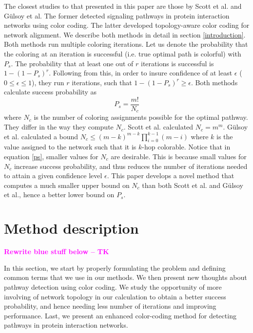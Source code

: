 \documentclass{ws-procs11x85}
\newcommand{\tk}[1]{{\bf {\textcolor{magenta}{#1 -- TK}}}}
\begin{document}
The closest studies to that presented in this paper are those by Scott et
al.\cite{scott} and G{\"u}lsoy et al\cite{gulsoy}. The former detected signaling
pathways in protein interaction networks using color coding. The latter
developed topology-aware color coding for network alignment. We describe both
methods in detail in section \ref{introduction}. Both methods run multiple 
coloring iterations. Let us denote the probability that the coloring at an
iteration is successful (i.e. true optimal path is colorful) with $P_s$. The
probability that at least one out of $r$ iterations is successful is $1 - (1 -
P_s)^r$. Following from this, in order to insure confidence of at least
$\epsilon$ ($0 \leq \epsilon \leq 1$), they run $r$ iterations, such that $1 -
(1 - P_s)^r \geq \epsilon$. Both methods calculate success probability as
\begin{equation}
P_s = \frac{m!}{N_c}
\label{ps}
\end{equation}
where $N_c$ is the number of coloring assignments possible for the optimal
pathway. They differ in the way they compute $N_c$. Scott et al.\cite{scott}
calculated $N_c = m^m$. G{\"u}lsoy et al.\cite{gulsoy} calculated a bound $N_c
\leq (m - k)^{m - k} \prod_{i=0}^{k-1} (m - i)$ where $k$ is the value assigned
to the network such that it is $k$-hop colorable. Notice that in equation
\ref{ps}, smaller values for $N_c$ are desirable. This is because small values
for $N_c$ increase success probability, and thus reduces the number of
iterations needed to attain a given confidence level $\epsilon$. This paper
develops a novel method that computes a much smaller upper bound on $N_c$ than
both Scott et al. and G{\"u}lsoy et al., hence a better lower bound on $P_s$.

\section{Method description}

\tk{Rewrite blue stuff below}

{\color {blue}
In this section, we start by properly formulating the problem and
defining common terms that we use in our methods. We then present new
thoughts about pathway detection using color coding. We study the
opportunity of more involving of network topology in our calculation
to obtain a better success probability, and hence needing less number
of iterations and improving performance. Last, we present an enhanced
color-coding method for detecting pathways in protein interaction
networks.
}
\end{document}

